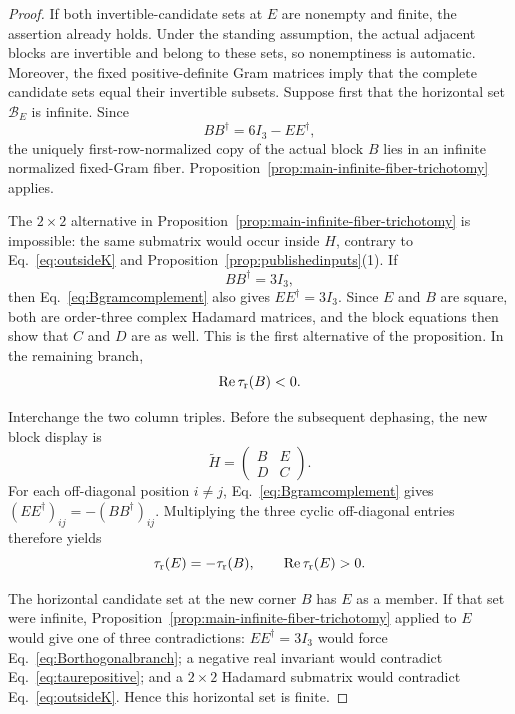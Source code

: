 \begin{proof}
If both invertible-candidate sets at $E$ are nonempty and finite, the assertion already holds.  Under the standing assumption, the actual adjacent blocks are invertible and belong to these sets, so nonemptiness is automatic. Moreover, the fixed positive-definite Gram matrices imply that the complete candidate sets equal their invertible subsets. Suppose first that the horizontal set $\mathcal B_E$ is infinite.  Since
\begin{equation}
BB^{\dagger}=6I_3-EE^{\dagger},
\label{eq:Bgramcomplement}
\end{equation}
the uniquely first-row-normalized copy of the actual block $B$ lies in an infinite normalized fixed-Gram fiber.  Proposition~\ref{prop:main-infinite-fiber-trichotomy} applies.

The $2\times2$ alternative in Proposition~\ref{prop:main-infinite-fiber-trichotomy} is impossible: the same submatrix would occur inside $H$, contrary to Eq.~\eqref{eq:outsideK} and Proposition~\ref{prop:publishedinputs}(1).  If
\begin{equation}
BB^{\dagger}=3I_3,
\label{eq:Borthogonalbranch}
\end{equation}
then Eq.~\eqref{eq:Bgramcomplement} also gives $EE^{\dagger}=3I_3$.  Since $E$ and $B$ are square, both are order-three complex Hadamard matrices, and the block equations then show that $C$ and $D$ are as well. This is the first alternative of the proposition. In the remaining branch,
\begin{equation}
\operatorname{Re}\tau_{\rm r}(B)<0.
\label{eq:taurbnegative}
\end{equation}

Interchange the two column triples.  Before the subsequent dephasing, the new block display is
\begin{equation}
\widetilde H=\begin{pmatrix}B&E\\D&C\end{pmatrix}.
\label{eq:columntripleswap}
\end{equation}
For each off-diagonal position $i\neq j$, Eq.~\eqref{eq:Bgramcomplement} gives $(EE^{\dagger})_{ij}=-(BB^{\dagger})_{ij}$.  Multiplying the three cyclic off-diagonal entries therefore yields
\begin{equation}
\tau_{\rm r}(E)=-\tau_{\rm r}(B),
\qquad
\operatorname{Re}\tau_{\rm r}(E)>0.
\label{eq:taurepositive}
\end{equation}

The horizontal candidate set at the new corner $B$ has $E$ as a member. If that set were infinite, Proposition~\ref{prop:main-infinite-fiber-trichotomy} applied to $E$ would give one of three contradictions: $EE^{\dagger}=3I_3$ would force Eq.~\eqref{eq:Borthogonalbranch}; a negative real invariant would contradict Eq.~\eqref{eq:taurepositive}; and a $2\times2$ Hadamard submatrix would contradict Eq.~\eqref{eq:outsideK}.  Hence this horizontal set is finite.


\end{proof}
